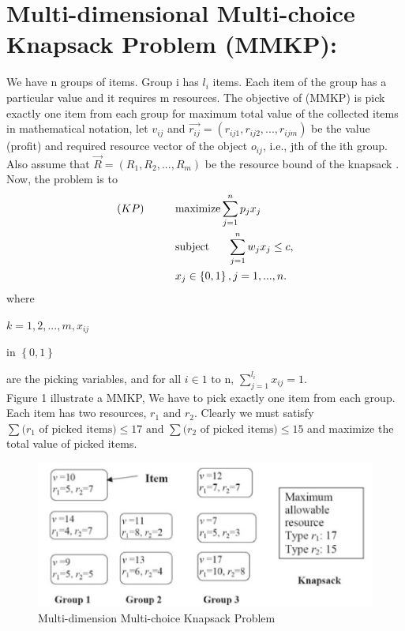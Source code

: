 \section{Multi-dimensional Multi-choice Knapsack Problem (MMKP):}
We have n groups of items. Group i has $l_{i}$ items. Each item of the group has a particular value and it requires m resources. The objective of (MMKP) is pick exactly one item from each group for maximum total value of the collected items in mathematical notation,  let $v_{ij}$ and $\overrightarrow{r_{ij}}=\left( r_{ij1}, r_{ij2}, ..., r_{ijm} \right)$ be the value (profit) and required resource vector of the object $o_{ij}$, i.e., jth of the ith group. Also assume that $\overrightarrow{R}=\left( R_{1}, R_{2}, ..., R_{m} \right)$ be the resource bound of the knapsack \cite{iqbal2010solving}.
 Now, the problem is to
\begin{subequations}
\renewcommand{\theequation}{\arabic{parentequation}--\arabic{equation}}
\begin{align}
    (KP)\hspace{1cm}&
    \text{maximize}\sum_{j=1}^{n}p_{j}x_{j}\\
    &\text{subject\hspace{.6cm}}\sum_{j=1}^{n}w_{j}x_{j}\le c,\\
    &x_{j}\in \left\{ 0, 1 \right\}, j=1,..., n.
\end{align}
\end{subequations}
where 


$k=1, 2,..., m, x_{ij}$



in $\left\{0, 1\right\}$



 are the picking variables, and for all $i\in 1 \text{ to n, }\sum_{j=1}^{l_{i}}x_{ij}=1.$\\
Figure 1 illustrate a MMKP, We have to pick exactly one item from each group. Each item has two resources, $r_{1} \text{ and }r_{2}$. Clearly we must satisfy $\sum\text{(}r_{1}\text{  of picked items)}\le17 \text{ and }\sum\text{(}r_{2}\text{ of picked items)}\le15$ and maximize the total value of picked items.
\begin{figure}[H]
	\begin{center}
		\includegraphics[scale=0.5]{fig1.png}
		\caption{Multi-dimension Multi-choice Knapsack Problem}
	\end{center}
\end{figure}

